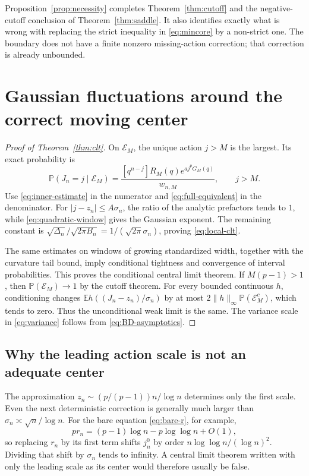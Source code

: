 \documentclass[11pt,a4paper]{article}
\numberwithin{equation}{section}
\theoremstyle{definition}
\theoremstyle{remark}
\newcommand{\Prob}{\mathbb P}\newcommand{\E}{\mathbb E}
\newcommand{\One}{\mathcal E_M}
\begin{document}
Proposition~\ref{prop:necessity} completes Theorem~\ref{thm:cutoff} and
the negative-cutoff conclusion of Theorem~\ref{thm:saddle}. It also
identifies exactly what is wrong with replacing the strict inequality in
\eqref{eq:mincore} by a non-strict one. The boundary does not have a
finite nonzero missing-action correction; that correction is already
unbounded.

\section{Gaussian fluctuations around the correct moving center}
\label{sec:fluctuations}

\begin{proof}[Proof of Theorem~\ref{thm:clt}]
On $\One$, the unique action $j>M$ is the largest. Its exact probability
is
\begin{equation}
 \Prob(J_n=j\mid\One)
 =\frac{[q^{n-j}]R_M(q)e^{a j^pG_M(q)}}{w_{n,M}},\qquad j>M.
 \label{eq:conditional-law}
\end{equation}
Use \eqref{eq:inner-estimate} in the numerator and
\eqref{eq:full-equivalent} in the denominator. For
$|j-z_n|\le A\sigma_n$, the ratio of the analytic prefactors tends to
$1$, while \eqref{eq:quadratic-window} gives the Gaussian exponent.
The remaining constant is
$\sqrt{\Delta_n}/\sqrt{2\pi B_n}=1/(\sqrt{2\pi}\sigma_n)$,
proving \eqref{eq:local-clt}.

The same estimates on windows of growing standardized width, together
with the curvature tail bound, imply conditional tightness and convergence
of interval probabilities. This proves the conditional central limit theorem.
If $M(p-1)>1$, then $\Prob(\One)\to1$ by the cutoff theorem. For every
bounded continuous $h$, conditioning changes
$\E h((J_n-z_n)/\sigma_n)$ by at most
$2\|h\|_\infty\Prob(\One^c)$, which tends to zero. Thus the
unconditional weak limit is the same. The variance scale in
\eqref{eq:variance} follows from \eqref{eq:BD-asymptotics}.
\end{proof}

\subsection{Why the leading action scale is not an adequate center}

The approximation $z_n\sim(p/(p-1))n/\log n$ determines only the first
scale. Even the next deterministic correction is generally much larger
than $\sigma_n\asymp\sqrt n/\log n$. For the bare equation
\eqref{eq:bare-r}, for example,
\[
 pr_n=(p-1)\log n-p\log\log n+O(1),
\]
so replacing $r_n$ by its first term shifts $j_n^0$ by order
$n\log\log n/(\log n)^2$. Dividing that shift by $\sigma_n$ tends to
infinity. A central limit theorem written with only the leading scale as
its center would therefore usually be false.
\end{document}
